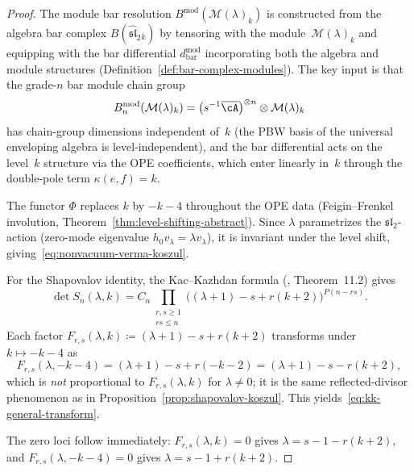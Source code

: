 \begin{proof}
The module bar resolution $B^\mathrm{mod}(\mathcal{M}(\lambda)_k)$
is constructed from the algebra bar complex
$B(\widehat{\mathfrak{sl}}_2{}_k)$ by tensoring with the
module~$\mathcal{M}(\lambda)_k$ and equipping with the bar
differential $d_{\mathrm{bar}}^{\mathrm{mod}}$ incorporating
both the algebra and module structures
(Definition~\ref{def:bar-complex-modules}). The key input is
that the grade-$n$ bar module chain group
\[
B_n^{\mathrm{mod}}(\mathcal{M}(\lambda)_k) =
\bigl(s^{-1}\overline{\cA}\bigr)^{\otimes n}
\otimes \mathcal{M}(\lambda)_k
\]
has chain-group dimensions independent of~$k$ (the PBW basis of
the universal enveloping algebra is level-independent), and
the bar differential acts on the level~$k$ structure via the
OPE coefficients, which enter linearly in~$k$ through the
double-pole term $\kappa(e,f) = k$.

The functor $\Phi$ replaces $k$ by $-k-4$ throughout the OPE
data (Feigin--Frenkel involution,
Theorem~\ref{thm:level-shifting-abstract}). Since $\lambda$
parametrizes the $\mathfrak{sl}_2$-action (zero-mode
eigenvalue $h_0 v_\lambda = \lambda v_\lambda$), it is
invariant under the level shift, giving~\eqref{eq:nonvacuum-verma-koszul}.

For the Shapovalov identity, the Kac--Kazhdan formula
(\cite{Kac}, Theorem~11.2) gives
\[
\det S_n(\lambda, k) = C_n
\prod_{\substack{r,s \geq 1 \\ rs \leq n}}
\bigl((\lambda+1) - s + r(k+2)\bigr)^{P(n-rs)}.
\]
Each factor $F_{r,s}(\lambda, k) \coloneqq (\lambda+1) - s + r(k+2)$
transforms under $k \mapsto -k-4$ as
\[
F_{r,s}(\lambda, -k\!-\!4) = (\lambda+1) - s + r(-k-2)
= (\lambda+1) - s - r(k+2),
\]
which is \emph{not} proportional to $F_{r,s}(\lambda, k)$
for $\lambda \neq 0$; it is the same reflected-divisor phenomenon
as in Proposition~\ref{prop:shapovalov-koszul}. This
yields~\eqref{eq:kk-general-transform}.

The zero loci follow immediately:
$F_{r,s}(\lambda, k) = 0$ gives
$\lambda = s - 1 - r(k+2)$, and
$F_{r,s}(\lambda, -k\!-\!4) = 0$ gives
$\lambda = s - 1 + r(k+2)$.
\end{proof}

